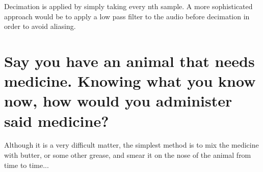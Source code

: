 \documentclass[titlepage]{scrartcl}
\begin{document}
Decimation is applied by simply taking every nth sample. A more sophisticated
approach would be to apply a low pass filter to the audio before decimation in
order to avoid aliasing.

\section{Say you have an animal that needs medicine. Knowing what you know now,
how would you administer said medicine?}
Although it is a very difficult matter, the simplest method is to mix the
medicine with butter, or some other grease, and smear it on the nose of the
animal from time to time...
\end{document}
